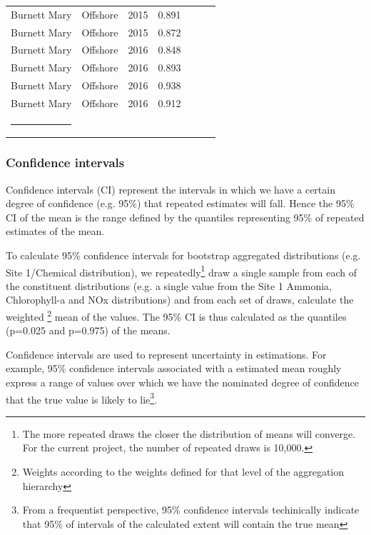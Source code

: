 \begin{longtable}{llccccc}
  Burnett Mary & Offshore & 2015 & 0.891 & \cellcolor[HTML]{00734D}{A} & \cellcolor[HTML]{00734D}{A} & \cellcolor[HTML]{00734D}{A} \\ 
  Burnett Mary & Offshore & 2015 & 0.872 & \cellcolor[HTML]{00734D}{A} & \cellcolor[HTML]{00734D}{A} & \cellcolor[HTML]{00734D}{A} \\ 
  Burnett Mary & Offshore & 2016 & 0.848 & \cellcolor[HTML]{00734D}{A} & \cellcolor[HTML]{00734D}{A} & \cellcolor[HTML]{B0D235}{B} \\ 
  Burnett Mary & Offshore & 2016 & 0.893 & \cellcolor[HTML]{00734D}{A} & \cellcolor[HTML]{00734D}{A} & \cellcolor[HTML]{00734D}{A} \\ 
  Burnett Mary & Offshore & 2016 & 0.938 & \cellcolor[HTML]{00734D}{A} & \cellcolor[HTML]{00734D}{A} & \cellcolor[HTML]{00734D}{A} \\ 
  Burnett Mary & Offshore & 2016 & 0.912 & \cellcolor[HTML]{00734D}{A} & \cellcolor[HTML]{00734D}{A} & \cellcolor[HTML]{00734D}{A} \\ 
   \hrule
\end{longtable}



\subsubsection{Confidence intervals}

Confidence intervals (CI) represent the intervals in which we have a certain degree of confidence
(e.g. 95\%) that repeated estimates will fall.  Hence the 95\% CI of the mean is the range defined
by the quantiles representing 95\% of repeated estimates of the mean.

To calculate 95\% confidence intervals for bootstrap aggregated distributions (e.g. Site 1/Chemical
distribution), we repeatedly\footnote{The more repeated draws the closer the distribution of means
will converge.  For the current project, the number of repeated draws is 10,000.}  draw a single
sample from each of the constituent distributions (e.g. a single value from the Site 1 Ammonia,
Chlorophyll-a and NOx distributions) and from each set of draws, calculate the weighted
\footnote{Weights according to the weights defined for that level of the aggregation hierarchy} mean
of the values.  The 95\% CI is thus calculated as the quantiles (p=0.025 and p=0.975) of the means.

Confidence intervals are used to represent uncertainty in estimations.
For example, 95\% confidence intervals associated with a estimated mean roughly express a range
of values over which we have the nominated degree of confidence that the true value is likely to
lie\footnote{From a frequentist perspective, 95\% confidence intervals techinically indicate that
  95\% of intervals of the calculated extent will contain the true mean}.

